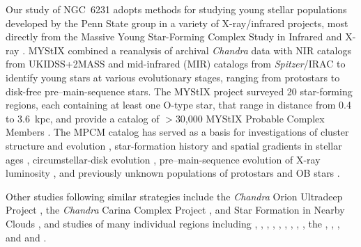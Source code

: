 \documentclass[twocolumn,tighten]{aastex61}
\begin{document}
Our study of NGC~6231 adopts methods for studying young stellar populations developed by the Penn State group in a variety of X-ray/infrared projects, most directly from the Massive Young Star-Forming Complex Study in Infrared and X-ray \citep[MYStIX;][]{2013ApJS..209...26F}. MYStIX combined a reanalysis of archival {\it Chandra} data with NIR catalogs from UKIDSS+2MASS and mid-infrared (MIR) catalogs from {\it Spitzer}/IRAC to identify young stars at various evolutionary stages, ranging from protostars to disk-free pre--main-sequence stars. The MYStIX project surveyed 20 star-forming regions, each containing at least one O-type star, that range in distance from 0.4 to 3.6~kpc, and provide a catalog of $>$30,000 MYStIX Probable Complex Members \citep[MPCM;][]{2013ApJS..209...32B}. The MPCM catalog has served as a basis for investigations of cluster structure and evolution \citep{2014ApJ...787..107K,2015ApJ...802...60K,2015ApJ...812..131K,2015ApJ...798..126J}, star-formation history and spatial gradients in stellar ages \citep{2014ApJ...787..109G, 2014ApJ...787..108G}, circumstellar-disk evolution \citep{2015ApJ...811...10R}, pre--main-sequence evolution of X-ray luminosity \citep{2016MNRAS.457.3836G}, and previously unknown populations of protostars \citep{2016ApJ...833..193R} and OB stars \citep{2017ApJ...838...61P}. 

Other studies following similar strategies include the {\it Chandra} Orion Ultradeep Project \citep[COUP;][]{2005ApJS..160..319G}, the {\it Chandra} Carina Complex Project \citep[CCCP;][]{2011ApJS..194....1T}, and Star Formation in Nearby Clouds \citep[SFiNCs;][]{2017ApJS..229...28G}, and studies of many individual regions including 
 \citep{2002ApJ...575..354G}, 
 \citep{2006AJ....131.2140T}, 
 \citep{2006ApJS..163..306G}, 
 \citep{2007ApJ...654..316G}, 
 \citep{2007ApJS..168..100W}, 
 \citep{2007ApJS..169..353B}, 
 \citep{2007ApJ...665..719T}, 
 \citep{2008ApJ...673..331G}, 
 \citep{2008ApJ...673..354F}, 
the  \citep{2008ApJ...675..464W}, 
 \citep{2009AJ....138..227F}, 
 \citep{2010ApJ...725.2485K}, and 
 and  \citep{2012MNRAS.426.2917G}. 
\end{document}
